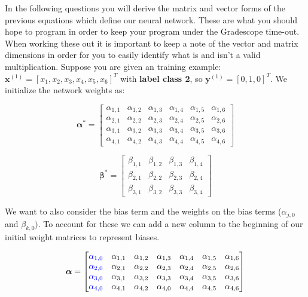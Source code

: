 \documentclass[11pt,addpoints,answers]{exam}
\newcommand{\xv}{\mathbf{x}}
\newcommand{\yv}{\mathbf{y}}
\begin{document}
\begin{questions}

\question In the following questions you will derive the matrix and vector forms of the previous equations which define our neural network. These are what you should hope to program in order to keep your program under the Gradescope time-out.\\
When working these out it is important to keep a note of the vector and matrix dimensions in order for you to easily identify what is and isn't a valid multiplication. Suppose you are given an training example: $\xv^{(1)}=[x_1,x_2,x_3,x_4,x_5,x_6]^T$ with \textbf{label class 2}, so $\yv^{(1)}=[0,1,0]^T$. We initialize the network weights as:
\begin{center}
$$\boldsymbol{\alpha^*}=
    \begin{bmatrix}
    \alpha_{1,1} & \alpha_{1,2} & \alpha_{1,3} & \alpha_{1,4} & \alpha_{1,5} & \alpha_{1,6} \\
    \alpha_{2,1} & \alpha_{2,2} & \alpha_{2,3} & \alpha_{2,4} & \alpha_{2,5} & \alpha_{2,6} \\
    \alpha_{3,1} & \alpha_{3,2} & \alpha_{3,3} & \alpha_{3,4} & \alpha_{3,5} & \alpha_{3,6} \\
    \alpha_{4,1} & \alpha_{4,2} & \alpha_{4,3} & \alpha_{4,4} & \alpha_{4,5} & \alpha_{4,6}
    \end{bmatrix}$$
    
$$\boldsymbol{\beta^*}=
    \begin{bmatrix}
    \beta_{1,1} & \beta_{1,2} & \beta_{1,3} & \beta_{1,4} \\
    \beta_{2,1} & \beta_{2,2} & \beta_{2,3} & \beta_{2,4} \\
    \beta_{3,1} & \beta_{3,2} & \beta_{3,3} & \beta_{3,4}
    \end{bmatrix}
$$
\end{center}
    
We want to also consider the bias term and the weights on the bias terms (${\alpha}_{j,0}$ and ${\beta}_{k,0})$. To account for these we can add a new column to the beginning of our initial weight matrices to represent biases.

$$\boldsymbol{\alpha}=
    \begin{bmatrix}
    \textcolor{blue}{\alpha_{1,0}} & \alpha_{1,1} & \alpha_{1,2} & \alpha_{1,3} & \alpha_{1,4} & \alpha_{1,5} & \alpha_{1,6} \\
    \textcolor{blue}{\alpha_{2,0}} & \alpha_{2,1} & \alpha_{2,2} & \alpha_{2,3} & \alpha_{2,4} & \alpha_{2,5} & \alpha_{2,6} \\
    \textcolor{blue}{\alpha_{3,0}} & \alpha_{3,1} & \alpha_{3,2} & \alpha_{3,3} & \alpha_{3,4} & \alpha_{3,5} & \alpha_{3,6} \\
    \textcolor{blue}{\alpha_{4,0}} & \alpha_{4,1} & \alpha_{4,2} & \alpha_{4,0} & \alpha_{4,4} & \alpha_{4,5} & \alpha_{4,6}
    \end{bmatrix}$$
    

\end{questions}
\end{document}
